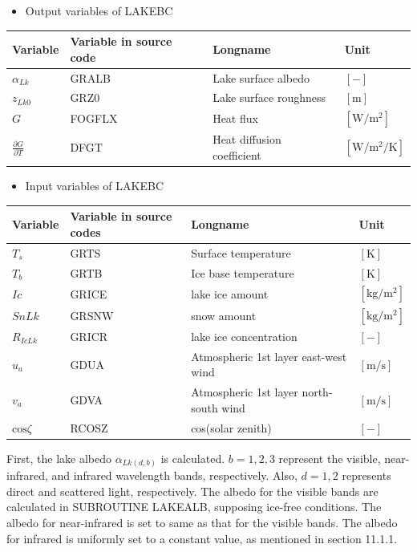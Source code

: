 \begin{itemize}
\tightlist
\item
  Output variables of LAKEBC
\end{itemize}

\begin{longtable}[]{@{}llll@{}}
\toprule\noalign{}
Variable & Variable in source code & Longname & Unit \\
\midrule\noalign{}
\endhead
\bottomrule\noalign{}
\endlastfoot
\(\alpha_{Lk}\) & GRALB & Lake surface albedo & \(\mathrm{[-]}\) \\
\(z_{Lk0}\) & GRZ0 & Lake surface roughness & \(\mathrm{[m]}\) \\
\(G\) & FOGFLX & Heat flux & \(\mathrm{[W/m^2]}\) \\
\(\frac{\partial G}{\partial T}\) & DFGT & Heat diffusion coefficient & \(\mathrm{[W/m^2/K]}\) \\
\end{longtable}

\begin{itemize}
\tightlist
\item
  Input variables of LAKEBC
\end{itemize}

\begin{longtable}[]{@{}llll@{}}
\toprule\noalign{}
Variable & Variable in source codes & Longname & Unit \\
\midrule\noalign{}
\endhead
\bottomrule\noalign{}
\endlastfoot
\(T_s\) & GRTS & Surface temperature & \(\mathrm{[K]}\) \\
\(T_b\) & GRTB & Ice base temperature & \(\mathrm{[K]}\) \\
\(Ic\) & GRICE & lake ice amount & \(\mathrm{[kg/m^2]}\) \\
\(SnLk\) & GRSNW & snow amount & \(\mathrm{[kg/m^2]}\) \\
\(R_{IcLk}\) & GRICR & lake ice concentration & \(\mathrm{[-]}\) \\
\(u_a\) & GDUA & Atmospheric 1st layer east-west wind & \(\mathrm{[m/s]}\) \\
\(v_a\) & GDVA & Atmospheric 1st layer north-south wind & \(\mathrm{[m/s]}\) \\
\(\mathrm{cos}\zeta\) & RCOSZ & cos(solar zenith) & \(\mathrm{[-]}\) \\
\end{longtable}

First, the lake albedo \(\alpha_{Lk(d,b)}\) is calculated. \(b=1,2,3\) represent the visible, near-infrared, and infrared wavelength bands, respectively. Also, \(d=1,2\) represents direct and
scattered light, respectively. The albedo for the visible bands are calculated in SUBROUTINE LAKEALB, supposing ice-free conditions. The albedo for near-infrared is set to same as that for the visible
bands. The albedo for infrared is uniformly set to a constant value, as mentioned in section 11.1.1.

